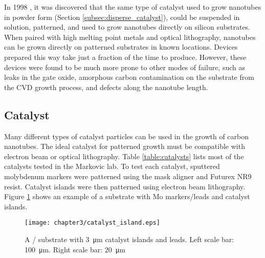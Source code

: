 In 1998 \cite{Kong1998a}, it was discovered that the same type of catalyst used to grow nanotubes in powder form (Section \ref{subsec:disperse_catalyst}), could be suspended in solution, patterned, and used to grow nanotubes directly on silicon substrates. When paired with high melting point metals and optical lithography, nanotubes can be grown directly on patterned substrates in known locations. Devices prepared this way take just a fraction of the time to produce. However, these devices were found to be much more prone to other modes of failure, such as leaks in the gate oxide, amorphous carbon contamination on the substrate from the CVD growth process, and defects along the nanotube length.

\subsection{Catalyst} 

Many different types of catalyst particles can be used in the growth of carbon nanotubes. The ideal catalyst for patterned growth must be compatible with electron beam or optical lithography. Table \ref{table:catalysts} lists most of the catalysts tested in the Markovic lab. To test each catalyst, sputtered molybdenum markers were patterned using the mask aligner and Futurex NR9 resist. Catalyst islands were then patterned using electron beam lithography. Figure \ref{fig:catalyst_islands} shows an example of a substrate with Mo markers/leads and catalyst islands.

\begin{figure}
	\centering
	\texttt{[image: chapter3/catalyst\_island.eps]}
	\caption{A / substrate with \SI{3}{\micro\meter} catalyst islands and  leads. Left scale bar: \SI{100}{\micro\meter}. Right scale bar: \SI{20}{\micro\meter} }
	\label{fig:catalyst_islands}
\end{figure}

